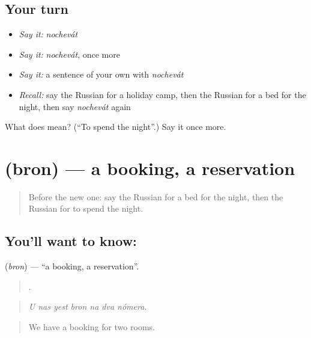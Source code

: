 \subsection*{Your turn}
\begin{itemize}
\raggedright
  \item \emph{Say it:} \emph{nochevát}
  \item \emph{Say it:} \emph{nochevát}, once more
  \item \emph{Say it:} a sentence of your own with \emph{nochevát}
  \item \emph{Recall:} say the Russian for a holiday camp, then the Russian for a bed for the night, then say \emph{nochevát} again
\end{itemize}

\begin{tcolorbox}[breakable,colback=teal!4,colframe=teal!35!black,title={Before you move on}]
What does  mean? (\textquotedblleft{}To spend the night\textquotedblright{}.) Say it once more.
\end{tcolorbox}
\section[\texorpdfstring{\ru{бронь} (bron)}{бронь (bron)}]{ (bron) — a booking, a reservation}

\label{lesson:RU-C428-bron}



\begin{quote}
Before the new one: say the Russian for a bed for the night, then the Russian for to spend the night.
\end{quote}

\subsection*{You'll want to know: }
\textbf{} (\emph{bron}) — \textquotedblleft{}a booking, a reservation\textquotedblright{}.

\begin{quote}
      .
\end{quote}

\begin{quote}
\emph{U nas yest bron na dva nómera.}
\end{quote}

\begin{quote}
We have a booking for two rooms.
\end{quote}

